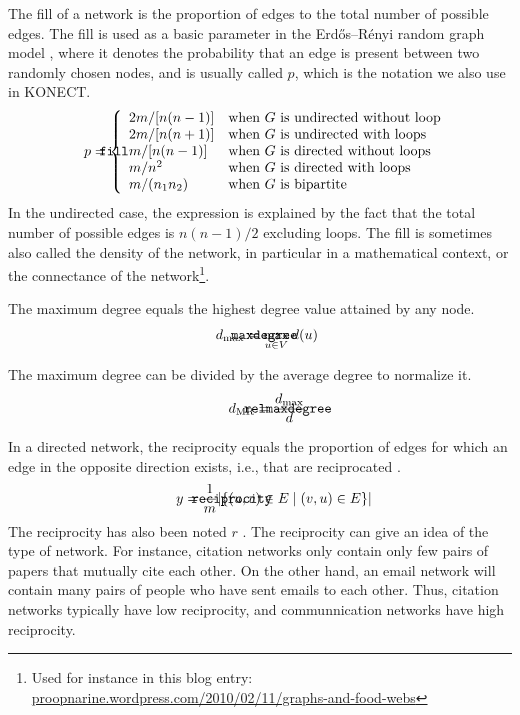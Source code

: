 \documentclass{article}
\def\mathnote#1{%
  \tag*{\rlap{\hspace\marginparsep\smash{\parbox[t]{\marginparwidth}{#1}}}}
}
\begin{document}
The fill of a network is the proportion of edges to the total
number of possible edges. 
The fill is used as a basic parameter in the Erdős--Rényi random graph
model \citep{b569}, where it denotes the probability that an edge is present between
two randomly chosen nodes, and is usually called $p$, which is the
notation we also use in KONECT. 
\begin{align}
  \mathnote{\texttt{fill}}
  p &= \left\{ \begin{array}{ll}
    2m / [n(n-1)] & \text{when $G$ is undirected without loop} \\
    2m / [n(n+1)] & \text{when $G$ is undirected with loops} \\
    m / [n(n-1)] & \text{when $G$ is directed without loops} \\
    m / n^2 & \text{when $G$ is directed with loops} \\
    m / (n_1 n_2) & \text{when $G$ is bipartite} 
  \end{array}\right. 
\end{align}
In the undirected case, the expression is explained by the fact that the
total number of possible edges is $n(n-1)/2$ excluding loops.  
The fill is sometimes also called the density of the network, in
particular in a mathematical context, or the connectance of the
network\footnote{Used for instance in this blog entry:  \href{https://proopnarine.wordpress.com/2010/02/11/graphs-and-food-webs/}{proopnarine.wordpress.com/2010/02/11/graphs-and-food-webs}}. 

The maximum degree equals the highest degree value attained
by any node.
\begin{align}
  \mathnote{\texttt{maxdegree}}
  d_{\max} &= \max_{u\in V} d(u)
\end{align}

The maximum degree can be divided by the average degree to normalize it.
\begin{align}
  \mathnote{\texttt{relmaxdegree}}
  d_{\mathrm{MR}} &= \frac {d_{\max}} {d}
\end{align}

In a directed network, the reciprocity equals the proportion of edges
for which an edge in the opposite direction exists, i.e., that are
reciprocated \citep{b866}.  
\begin{align}
  \mathnote{\texttt{reciprocity}}
  y = \frac 1 m  | \{ (u,v) \in E \mid (v,u) \in E \} | 
\end{align}
The reciprocity has also been noted $r$ \citep[e.g.][]{b867}. 
The reciprocity can give an idea of the type of network.  For instance,
citation networks only contain only few pairs of papers that mutually
cite each other.  On the other hand, an email network will contain many
pairs of people who have sent emails to each other.  Thus, citation
networks typically have low reciprocity, and communnication networks
have high reciprocity. 
\end{document}
